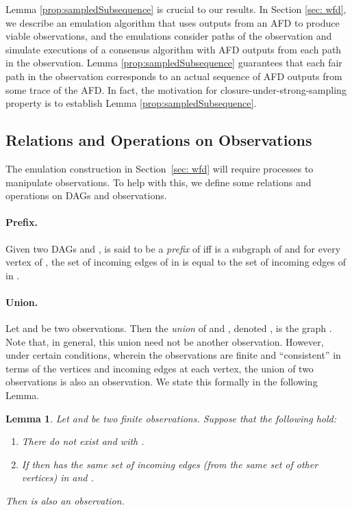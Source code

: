 \documentclass[11pt]{article}
\numberwithin{theorem}{section}
\newtheorem{lemma}[theorem]{Lemma}
\begin{document}
Lemma \ref{prop:sampledSubsequence} is crucial to our results. In Section \ref{sec: wfd}, we describe an emulation algorithm that uses outputs from an AFD to produce viable observations, and the emulations consider paths of the observation and simulate executions of a consensus algorithm with AFD outputs from each path in the observation. Lemma \ref{prop:sampledSubsequence} guarantees that each fair path in the observation corresponds to an actual sequence of AFD outputs from some trace of the AFD. In fact, the motivation for closure-under-strong-sampling property is to establish Lemma \ref{prop:sampledSubsequence}. 

\subsection{Relations and Operations on Observations}\label{subsec:OperationsOnObservations}

The emulation construction in Section~\ref{sec: wfd} will require
processes to manipulate observations.  To help with this, we define
some relations and operations on DAGs and observations. 

\paragraph{Prefix.}
Given two DAGs  and ,  is said to be a
\emph{prefix} of  iff  is a subgraph of  and for every
vertex  of , the set of incoming edges of  in  is equal
to the set of incoming edges of  in .

\paragraph{Union.}
Let  and  be two observations. 
Then the \emph{union}  of  and , denoted , is
the graph .
Note that, in general, this union need not be another observation.
However, under certain conditions, wherein the observations are finite and ``consistent'' in terms of the vertices and incoming edges at each vertex, the union of two observations is also an observation. We state this formally in the following Lemma.

\begin{lemma}
\label{prop:obs:union}
Let  and  be two finite observations. 
Suppose that the following hold:
\begin{enumerate}
\item
There do not exist  and 
with .  
\item
If  then  has the same set of incoming edges (from
the same set of other vertices) in  and .
\end{enumerate}
Then  is also an observation. 
\end{lemma}
\end{document}
